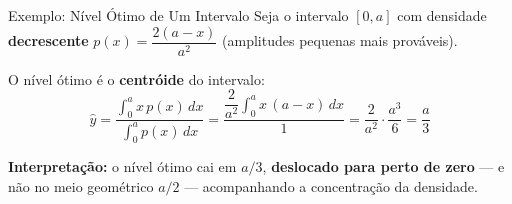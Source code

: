 
\begin{frame}{Exemplo: Nível Ótimo de Um Intervalo}
  Seja o intervalo $[0, a]$ com densidade \textbf{decrescente}
  $p(x) = \dfrac{2(a-x)}{a^2}$ (amplitudes pequenas mais prováveis).

  \vspace{0.2cm}
  O nível ótimo é o \textbf{centróide} do intervalo:
  \[
    \hat{y} = \frac{\displaystyle\int_0^a x\,p(x)\,dx}
                   {\displaystyle\int_0^a p(x)\,dx}
            = \frac{\dfrac{2}{a^2}\displaystyle\int_0^a x\,(a-x)\,dx}{1}
            = \frac{2}{a^2}\cdot\frac{a^3}{6}
            = \boxed{\dfrac{a}{3}}
  \]

  \vspace{0.15cm}
  \textbf{Interpretação:} o nível ótimo cai em $a/3$, \textbf{deslocado
  para perto de zero} — e não no meio geométrico $a/2$ — acompanhando a
  concentração da densidade.
\end{frame}


